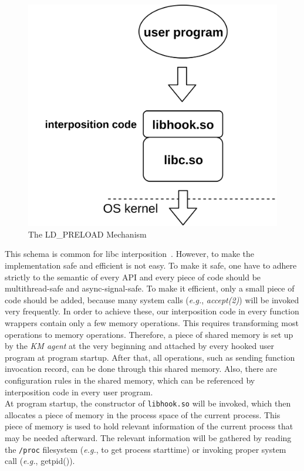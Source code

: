 \documentclass[letterpaper,twocolumn,10pt]{article}
\begin{document}
\begin{figure}[H]
    \centering
    \includegraphics[scale=0.07]{singlemachine}
    \caption{The LD\_PRELOAD Mechanism}
    \label{fig:ldpreload}
\end{figure}

This schema is common for libc interposition~\cite{citesomebody}. However, to
make the implementation safe and efficient is not easy. To make it safe, one
have to adhere strictly to the semantic of every API and every piece of code
should be multithread-safe and async-signal-safe. To make it efficient, only
a small piece of code should be added, because many system calls
(\textit{e.g.}, \textit{accept(2)}) will be invoked very frequently. In order
to achieve these, our interposition code in every function wrappers contain
only a few memory operations. This requires transforming most operations to
memory operations. Therefore, a piece of shared memory is set up by the
\textit{KM agent} at the very beginning and attached by every hooked user
program at program startup. After that, all operations, such as sending
function invocation record, can be done through this shared memory. Also,
there are configuration rules in the shared memory, which can be referenced
by interposition code in every user program.\\ 

At program startup, the constructor of \texttt{libhook.so} will be invoked,
which then allocates a piece of memory in the process space of the current
process. This piece of memory is used to hold relevant information of the
current process that may be needed afterward. The relevant information will
be gathered by reading the \texttt{/proc} filesystem (\textit{e.g.}, to get
process starttime) or invoking proper system call (\textit{e.g.}, getpid()). 
\end{document}
